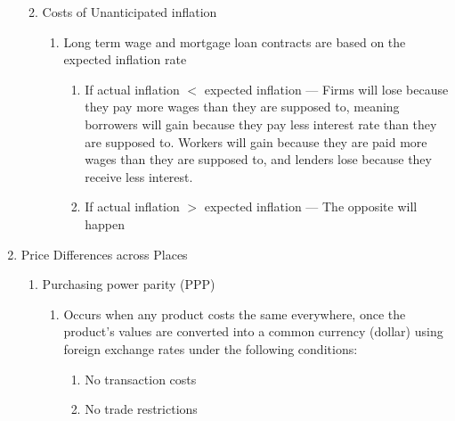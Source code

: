 \documentclass[12pt]{article}
\begin{document}
\begin{enumerate}
\begin{enumerate}
\begin{enumerate}
            \end{enumerate}

          \item Costs of Unanticipated inflation

            \begin{enumerate}

              \item Long term wage and mortgage loan contracts are based on the expected inflation rate

                \begin{enumerate}

                  \item If actual inflation $<$ expected inflation — Firms will lose because they pay more wages than they are supposed to, meaning borrowers will gain because they pay less interest rate than they are supposed to. Workers will gain because they are paid more wages than they are supposed to, and lenders lose because they receive less interest.

                  \item If actual inflation $>$ expected inflation — The opposite will happen

                \end{enumerate}

            \end{enumerate}

        \end{enumerate}

      \item Price Differences across Places

        \begin{enumerate}

          \item Purchasing power parity (PPP)

            \begin{enumerate}

              \item Occurs when any product costs the same everywhere, once the product's values are converted into a common currency (dollar) using foreign exchange rates under the following conditions:
                \begin{enumerate}

                  \item No transaction costs

                  \item No trade restrictions


\end{enumerate}
\end{enumerate}
\end{enumerate}
\end{enumerate}
\end{document}
